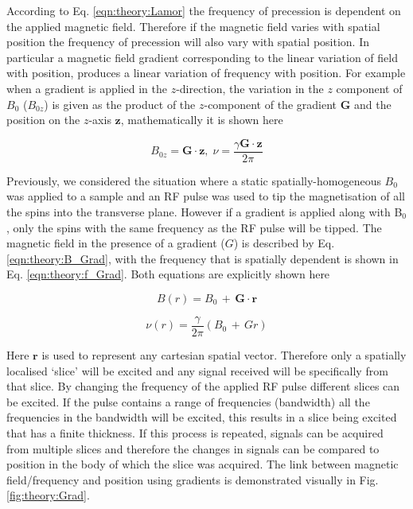 According to Eq. \ref{eqn:theory:Lamor} the frequency of precession is dependent on the applied magnetic field. Therefore if the magnetic field varies with spatial position the frequency of precession will also vary with spatial position. In particular a magnetic field gradient corresponding to the linear variation of field with position, produces a linear variation of frequency with position. For example when a gradient is applied in the $z$-direction, the variation in the $z$ component of $B_0$ ($B_{0z}$) is given as the product of the $z$-component of the gradient $\mathbf{G}$ and the position on the $z$-axis $\mathbf{z}$, mathematically it is shown here

\begin{equation}
    B_{0z} = \mathbf{G}\cdot \mathbf{z},\; \nu = \frac{\gamma \mathbf{G} \cdot \mathbf{z}}{2\pi} 
\end{equation}

Previously, we considered the situation where a static spatially-homogeneous $B_0$ was applied to a sample and an \ac{RF} pulse was used to tip the magnetisation of all the spins into the transverse plane. However if a gradient is applied along with B$_0$, only the spins with the same frequency as the \ac{RF} pulse will be tipped. The magnetic field in the presence of a gradient ($G$) is described by Eq. \ref{eqn:theory:B_Grad}, with the frequency that is spatially dependent is shown in Eq. \ref{eqn:theory:f_Grad}. Both equations are explicitly shown here

\begin{equation}
    B(r) = B_0 \, + \, \mathbf{G} \cdot \mathbf{r}
    \label{eqn:theory:B_Grad}
\end{equation}

\begin{equation}
    \nu(r) = \frac{\gamma}{2\pi}(B_0 \, + \, Gr)
    \label{eqn:theory:f_Grad}
\end{equation}

\noindent Here $\mathbf{r}$ is used to represent any cartesian spatial vector. Therefore only a spatially localised `slice' will be excited and any signal received will be specifically from that slice. By changing the frequency of the applied \ac{RF} pulse different slices can be excited. If the pulse contains a range of frequencies (bandwidth) all the frequencies in the bandwidth will be excited, this results in a slice being excited that has a finite thickness. If this process is repeated, signals can be acquired from multiple slices and therefore the changes in signals can be compared to position in the body of which the slice was acquired. The link between magnetic field/frequency and position using gradients is demonstrated visually in Fig. \ref{fig:theory:Grad}.

